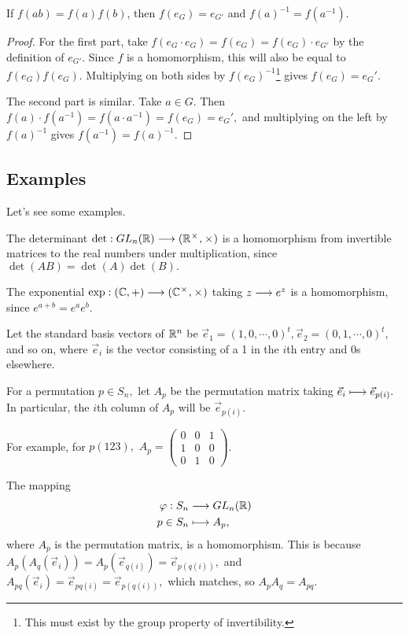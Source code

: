 \begin{proposition}
If $f(ab) = f(a)f(b)$, then $f(e_G) = e_{G'}$ and $f(a)^{-1} = f(a^{-1})$. 
\end{proposition}
\begin{proof}
For the first part, take $f(e_G \cdot e_G) = f(e_G) = f(e_G) \cdot e_{G'}$ by the definition of $e_{G'}.$ Since $f$ is a homomorphism, this will also be equal to $f(e_G)f(e_G).$ Multiplying on both sides by $f(e_G)^{-1}$\footnote{This must exist by the group property of invertibility.} gives $f(e_G) = e_G'.$

The second part is similar. Take $a \in G.$ Then $f(a)\cdot f(a^{-1}) = f(a \cdot a^{-1}) = f(e_G) = e_G',$ and multiplying on the left by $f(a)^{-1}$ gives $f(a^{-1}) = f(a)^{-1}.$
\end{proof}

\subsection{Examples}
Let's see some examples.
\begin{example}
The determinant $\text{det}: GL_n(\mathbb R) \longrightarrow (\mathbb R^{\hspace{0.05em}{\times}\hspace{0.05em}}, \hspace{0.05em}{\times}\hspace{0.05em})$ is a homomorphism from invertible matrices to the real numbers under multiplication, since $\det(AB) = \det(A)\det(B).$ 
\end{example}

\begin{example}
The exponential $\text{exp}: (\mathbb C, +) \longrightarrow (\mathbb C^{\hspace{0.05em}{\times}\hspace{0.05em}}, \hspace{0.05em}{\times}\hspace{0.05em})$ taking $z \longrightarrow e^z$ is a homomorphism, since $e^{a+b} = e^a e^b.$
\end{example}
Let the standard basis vectors of $\mathbb R^n$ be $\vec{e}_1 = (1, 0, \cdots, 0)^t, \vec{e}_2 = (0, 1, \cdots, 0)^t,$ and so on, where $\vec{e}_i$ is the vector consisting of a 1 in the $i$th entry and 0s elsewhere.

For a permutation $p \in S_n,$ let $A_p$ be the permutation matrix taking $\vec{e}_i \longmapsto \vec{e}_{p(i)}.$ In particular, the $i$th column of $A_p$ will be $\vec{e}_{p(i)}.$ 

For example, for $p  (123),$ $A_p = \begin{pmatrix} 0 & 0 & 1 \\ 1 & 0 & 0 \\ 0 & 1 & 0 \end{pmatrix}$.

\begin{example}
The mapping
\begin{align*}
\varphi: S_n &\longrightarrow GL_n(\mathbb R) \\
p\in S_n &\longmapsto A_p,
\end{align*}
where $A_p$ is the permutation matrix, is a homomorphism. This is because $A_p(A_q(\vec{e}_i)) = A_p(\vec{e}_{q(i)}) = \vec{e}_{p(q(i))},$ and $A_{pq}(\vec{e}_i) = \vec{e}_{pq(i)} = \vec{e}_{p(q(i))},$ which matches, so $A_pA_q = A_{pq}.$
\end{example}

